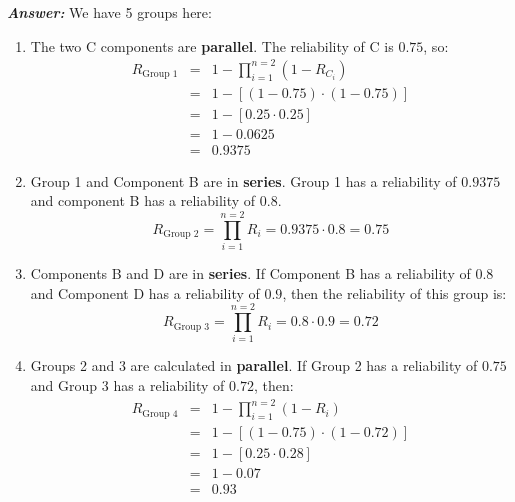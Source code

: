 \begin{enumerate}
    \textcolor{Green3}{\textbf{\emph{Answer:}}} We have 5 groups here:
    \begin{enumerate}[label=Group \arabic*., labelwidth=4em, labelsep=1em, leftmargin=!]
        \item The two C components are \textbf{parallel}. The reliability of C is $0.75$, so:
        \begin{equation*}
            \begin{array}{rcl}
                R_{\text{Group 1}} &=& 1 - \displaystyle\prod_{i=1}^{n=2} \left(1 - R_{C_{i}}\right) \\ [1.3em]
                &=& 1 - \left[
                    \left(1 - 0.75\right)
                    \cdot
                    \left(1 - 0.75\right)
                \right] \\ [.5em]
                &=& 1 - \left[ 0.25 \cdot 0.25 \right] \\ [.5em]
                &=& 1 - 0.0625 \\ [.5em]
                &=& 0.9375
            \end{array}
        \end{equation*}

        \item Group 1 and Component B are in \textbf{series}. Group 1 has a reliability of $0.9375$ and component B has a reliability of $0.8$.
        \begin{equation*}
            R_{\text{Group 2}} = \displaystyle\prod_{i=1}^{n=2} R_{i} = 0.9375 \cdot 0.8 = 0.75
        \end{equation*}

        \item Components B and D are in \textbf{series}. If Component B has a reliability of $0.8$ and Component D has a reliability of $0.9$, then the reliability of this group is:
        \begin{equation*}
            R_{\text{Group 3}} = \displaystyle\prod_{i=1}^{n=2} R_{i} = 0.8 \cdot 0.9 = 0.72
        \end{equation*}

        \newpage

        \item Groups 2 and 3 are calculated in \textbf{parallel}. If Group 2 has a reliability of $0.75$ and Group 3 has a reliability of $0.72$, then:
        \begin{equation*}
            \begin{array}{rcl}
                R_{\text{Group 4}} &=& 1 - \displaystyle\prod_{i=1}^{n=2} \left(1 - R_{i}\right) \\ [1.3em]
                &=& 1 - \left[
                    \left(1 - 0.75\right)
                    \cdot
                    \left(1 - 0.72\right)
                \right] \\ [.5em]
                &=& 1 - \left[ 0.25 \cdot 0.28 \right] \\ [.5em]
                &=& 1 - 0.07 \\ [.5em]
                &=& 0.93
            \end{array}
        \end{equation*}


\end{enumerate}
\end{enumerate}
